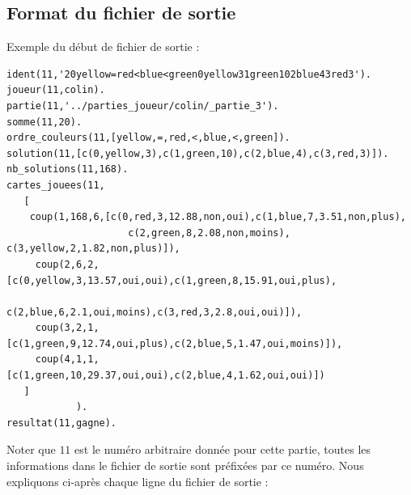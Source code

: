 \documentclass[a4paper,12pt]{article}
\begin{document}
\subsection*{Format du fichier de sortie}
Exemple du début de fichier de sortie :

\begin{Verbatim}
ident(11,'20yellow=red<blue<green0yellow31green102blue43red3').
joueur(11,colin).
partie(11,'../parties_joueur/colin/_partie_3').
somme(11,20).
ordre_couleurs(11,[yellow,=,red,<,blue,<,green]).
solution(11,[c(0,yellow,3),c(1,green,10),c(2,blue,4),c(3,red,3)]).
nb_solutions(11,168).
cartes_jouees(11,
   [
 	coup(1,168,6,[c(0,red,3,12.88,non,oui),c(1,blue,7,3.51,non,plus), 
 				     c(2,green,8,2.08,non,moins), c(3,yellow,2,1.82,non,plus)]),
     coup(2,6,2,[c(0,yellow,3,13.57,oui,oui),c(1,green,8,15.91,oui,plus),
     				  c(2,blue,6,2.1,oui,moins),c(3,red,3,2.8,oui,oui)]),
     coup(3,2,1,[c(1,green,9,12.74,oui,plus),c(2,blue,5,1.47,oui,moins)]),
     coup(4,1,1,[c(1,green,10,29.37,oui,oui),c(2,blue,4,1.62,oui,oui)])
   ]
            ).
resultat(11,gagne).
\end{Verbatim}

Noter que $11$ est le numéro arbitraire donnée pour cette partie, toutes les informations dans le fichier de sortie sont préfixées par ce numéro. Nous expliquons ci-après chaque ligne du fichier de sortie :
\end{document}
